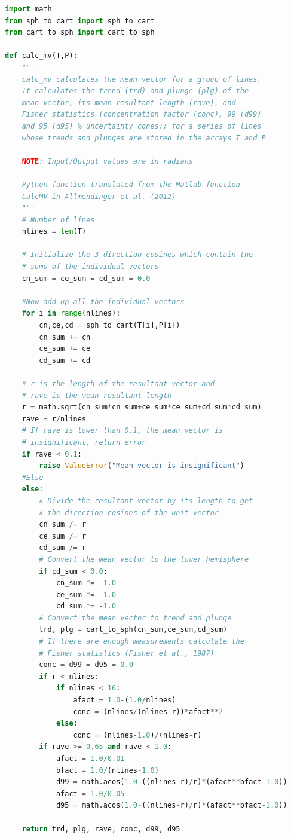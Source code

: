 \documentclass[a4paper , 12pt]{book}
\begin{document}
\begin{center}
\begin{lstlisting}[language=Python, frame=single]
import math
from sph_to_cart import sph_to_cart
from cart_to_sph import cart_to_sph

def calc_mv(T,P):
	"""
	calc_mv calculates the mean vector for a group of lines.
	It calculates the trend (trd) and plunge (plg) of the
	mean vector, its mean resultant length (rave), and
	Fisher statistics (concentration factor (conc), 99 (d99)
	and 95 (d95) % uncertainty cones); for a series of lines
	whose trends and plunges are stored in the arrays T and P
	
	NOTE: Input/Output values are in radians
	
	Python function translated from the Matlab function
	CalcMV in Allmendinger et al. (2012)
	"""
	# Number of lines
	nlines = len(T)
	
	# Initialize the 3 direction cosines which contain the
	# sums of the individual vectors 
	cn_sum = ce_sum = cd_sum = 0.0
	
	#Now add up all the individual vectors
	for i in range(nlines):
		cn,ce,cd = sph_to_cart(T[i],P[i])
		cn_sum += cn
		ce_sum += ce
		cd_sum += cd
	
	# r is the length of the resultant vector and
	# rave is the mean resultant length
	r = math.sqrt(cn_sum*cn_sum+ce_sum*ce_sum+cd_sum*cd_sum)
	rave = r/nlines
	# If rave is lower than 0.1, the mean vector is
	# insignificant, return error
	if rave < 0.1:
		raise ValueError("Mean vector is insignificant")
	#Else 
	else:
		# Divide the resultant vector by its length to get
		# the direction cosines of the unit vector
		cn_sum /= r
		ce_sum /= r
		cd_sum /= r
		# Convert the mean vector to the lower hemisphere
		if cd_sum < 0.0:
			cn_sum *= -1.0
			ce_sum *= -1.0
			cd_sum *= -1.0
		# Convert the mean vector to trend and plunge
		trd, plg = cart_to_sph(cn_sum,ce_sum,cd_sum)
		# If there are enough measurements calculate the
		# Fisher statistics (Fisher et al., 1987)
		conc = d99 = d95 = 0.0
		if r < nlines:
			if nlines < 16:
				afact = 1.0-(1.0/nlines)
				conc = (nlines/(nlines-r))*afact**2
			else:
				conc = (nlines-1.0)/(nlines-r)
		if rave >= 0.65 and rave < 1.0:
			afact = 1.0/0.01
			bfact = 1.0/(nlines-1.0)
			d99 = math.acos(1.0-((nlines-r)/r)*(afact**bfact-1.0))
			afact = 1.0/0.05
			d95 = math.acos(1.0-((nlines-r)/r)*(afact**bfact-1.0))
	
	return trd, plg, rave, conc, d99, d95
\end{lstlisting}    
\end{center}
\end{document}
